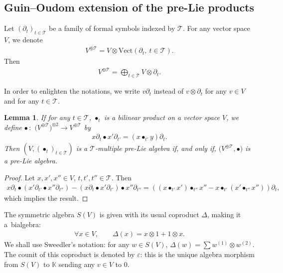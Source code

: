 \documentclass[10pt,a4paper]{amsart}
\numberwithin{equation}{section}
\newtheorem{Lemma}[Theorem]{Lemma}
\newcommand{\K}{\mathbb{K}}
\newcommand{\T}{\mathcal{T}}
\begin{document}
\subsection{Guin--Oudom extension of the pre-Lie products}

{\samepage\begin{Notation}
Let $(\partial_t)_{t\in \T}$ be a family of formal symbols indexed by $\T$. For any vector space~$V$, we denote
\begin{gather*}
V^{\oplus \T}=V\otimes \mathrm{Vect}(\partial_t,\:t\in \T).
\end{gather*}
Then
\begin{gather*}
V^{\oplus \T}=\bigoplus_{t\in \T} V\otimes \partial_t.
\end{gather*}
\end{Notation}
In order to enlighten the notations, we write $v\partial_t$ instead of $v\otimes \partial_t$
for any $v\in V$ and for any $t\in \T$.

}

\begin{Lemma}
If for any $t\in \T$, $\bullet_t$ is a bilinear product on a vector space $V$,
we define $\bullet\,{:}$ $\big(V^{\oplus \T}\big)^{\otimes 2}\longrightarrow V^{\oplus \T}$ by
\begin{gather*}
x\partial_t \bullet x'\partial_{t'}=(x\bullet_{t'} y)\partial_t.
\end{gather*}
Then $(V,(\bullet_t)_{t\in \T})$ is a $\T$-multiple pre-Lie algebra if,
and only if, $\big(V^{\oplus \T},\bullet\big)$ is a pre-Lie algebra.
\end{Lemma}

\begin{proof}
Let $x,x',x''\in V$, $t,t',t''\in \T$. Then
\begin{gather*}
x\partial_t\bullet (x'\partial_{t'}\bullet x''\partial_{t''})-(x\partial_t\bullet x'\partial_{t'})\bullet x''\partial_{t''}
=\left((x\bullet_{t'} x')\bullet_{t''} x''-x\bullet_{t'}(x'\bullet_{t''}x'')\right)\partial_t,
\end{gather*}
which implies the result.
\end{proof}

\begin{Notation}
The symmetric algebra $S(V)$ is given with its usual coproduct $\Delta$, making it a~bialgebra:
\begin{gather*}
\forall x\in V,\qquad \Delta(x)=x\otimes 1+1\otimes x.
\end{gather*}
We shall use Sweedler's notation: for any $w\in S(V)$, $\Delta(w)=\sum w^{(1)}\otimes w^{(2)}$.
The counit of this coproduct is denoted by $\varepsilon$: this is the unique algebra morphism from $S(V)$ to $\K$ sending any $v\in V$ to $0$.
\end{Notation}
\end{document}
